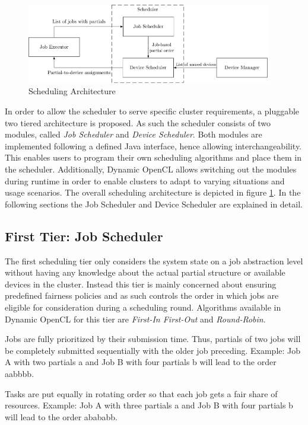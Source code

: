 \begin{figure}[!htb]
	\includegraphics[width=0.95\textwidth]{drawings/scheduling_arch.pdf}
	\centering
	\caption{Scheduling Architecture}
	\label{img:scheduling_arch}
\end{figure}

In order to allow the scheduler to serve specific cluster requirements, a pluggable two tiered architecture is proposed. As such the scheduler consists of two modules, called \textit{Job Scheduler} and \textit{Device Scheduler}. Both modules are implemented following a defined Java interface, hence allowing interchangeability. This enables users to program their own scheduling algorithms and place them in the scheduler. Additionally, Dynamic OpenCL allows switching out the modules during runtime in order to enable clusters to adapt to varying situations and usage scenarios. The overall scheduling architecture is depicted in figure \ref{img:scheduling_arch}. In the following sections the Job Scheduler and Device Scheduler are explained in detail.

\subsection{First Tier: Job Scheduler}
The first scheduling tier only considers the system state on a job abstraction level without having any knowledge about the actual partial structure or available devices in the cluster. Instead this tier is mainly concerned about ensuring predefined fairness policies and as such controls the order in which jobs are eligible for consideration during a scheduling round. Algorithms available in Dynamic OpenCL for this tier are \textit{First-In First-Out} and \textit{Round-Robin}.

\begin{description}[style=nextline]
	\item[First-In First-Out]
	Jobs are fully prioritized by their submission time. Thus, partials of two jobs will be completely submitted sequentially with the older job preceding. Example: Job A with two partials a and Job B with four partials b will lead to the order aabbbb.
	\item[Round-Robin]
	Tasks are put equally in rotating order so that each job gets a fair share of resources. Example: Job A with three partials a and Job B with four partials b will lead to the order abababb.
\end{description}


